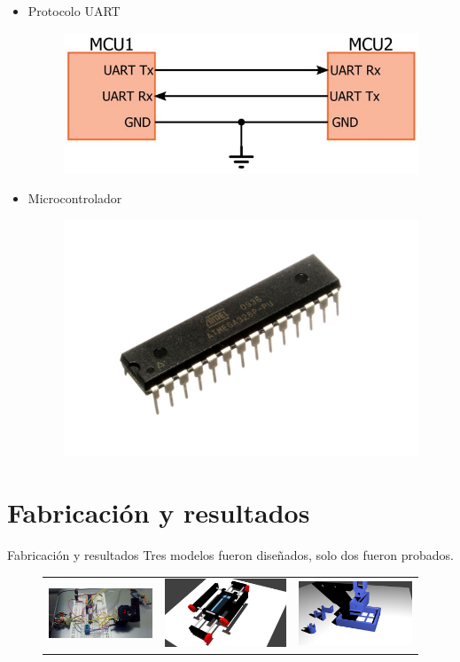 \documentclass{beamer}
\begin{document}
    \begin{frame}
    	\begin{itemize}
    		\item Protocolo UART
    		\begin{figure}[h]
    			\centering
    			\includegraphics[width = 0.5\linewidth]{figures/uart.jpg}
    		\end{figure}
    		\item Microcontrolador
    		\begin{figure}[h]
    			\centering
    			\includegraphics[width = 0.5\linewidth]{figures/atmega.jpg}
    		\end{figure}
    	\end{itemize}    
    \end{frame}
    
    \section{Fabricación y resultados}
    \begin{frame}{Fabricación y resultados}
    	Tres modelos fueron diseñados, solo dos fueron probados.
    	\begin{figure}
    		\centering
    		\begin{tabular}{ccc}
   				\includegraphics[width=0.3\linewidth]{figures/breadboard} & 
   				\includegraphics[width=0.3\linewidth]{figures/system2.jpg} &
   				\includegraphics[width=0.3\linewidth]{figures/model3.png}
    		\end{tabular}
    	\end{figure}
    \end{frame}
    
\end{document}
